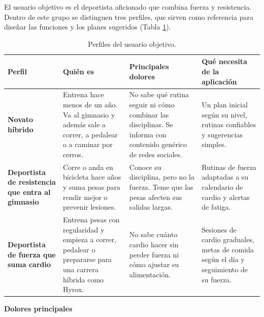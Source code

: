El usuario objetivo es el deportista aficionado que combina fuerza y resistencia. Dentro de este grupo se distinguen tres perfiles, que sirven como referencia para diseñar las funciones y los planes sugeridos (Tabla \ref{tab:perfiles_objetivo}).

\begin{table}[h!]
    \centering
    \renewcommand{\arraystretch}{1.4}
    \begin{tabular}{|>{\raggedright\arraybackslash}m{2.8cm}|>{\raggedright\arraybackslash}m{3.7cm}|>{\raggedright\arraybackslash}m{3.7cm}|>{\raggedright\arraybackslash}m{3.7cm}|}
        \hline
        \rowcolor[HTML]{EFEFEF}
        \textbf{Perfil} & \textbf{Quién es} & \textbf{Principales dolores} & \textbf{Qué necesita de la aplicación} \\ \hline
        \textbf{Novato híbrido} & Entrena hace menos de un año. Va al gimnasio y además sale a correr, a pedalear o a caminar por cerros. & No sabe qué rutina seguir ni cómo combinar las disciplinas. Se informa con contenido genérico de redes sociales. & Un plan inicial según su nivel, rutinas confiables y sugerencias simples. \\ \hline
        \textbf{Deportista de resistencia que entra al gimnasio} & Corre o anda en bicicleta hace años y suma pesas para rendir mejor o prevenir lesiones. & Conoce su disciplina, pero no la fuerza. Teme que las pesas afecten sus salidas largas. & Rutinas de fuerza adaptadas a su calendario de cardio y alertas de fatiga. \\ \hline
        \textbf{Deportista de fuerza que suma cardio} & Entrena pesas con regularidad y empieza a correr, pedalear o prepararse para una carrera híbrida como Hyrox. & No sabe cuánto cardio hacer sin perder fuerza ni cómo ajustar su alimentación. & Sesiones de cardio graduales, metas de comida según el día y seguimiento de su fuerza. \\ \hline
    \end{tabular}
    \caption{Perfiles del usuario objetivo.}
    \label{tab:perfiles_objetivo}
\end{table}
\textbf{Dolores principales}

